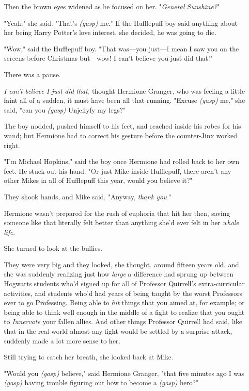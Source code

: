 Then the brown eyes widened as he focused on her. "\emph{General Sunshine?}"

"Yeah," she said. "That's \emph{(gasp)} me." If the Hufflepuff boy said
anything about her being Harry Potter's love interest, she decided, he was
going to die.

"Wow," said the Hufflepuff boy. "That was---you just---I mean I saw you on the
screens before Christmas but---wow! I can't believe you just did that!"

There was a pause.

\emph{I can't believe I just did that,} thought Hermione Granger, who was
feeling a little faint all of a sudden, it must have been all that running.
"Excuse \emph{(gasp)} me," she said, "can you \emph{(gasp)} Unjellyfy my legs?"

The boy nodded, pushed himself to his feet, and reached inside his robes for
his wand; but Hermione had to correct his gesture before the counter-Jinx
worked right.

"I'm Michael Hopkins," said the boy once Hermione had rolled back to her own
feet. He stuck out his hand. "Or just Mike inside Hufflepuff, there aren't any
other Mikes in all of Hufflepuff this year, would you believe it?"

They shook hands, and Mike said, "Anyway, \emph{thank you.}"

Hermione wasn't prepared for the rush of euphoria that hit her then, saving
someone like that literally felt better than anything she'd ever felt in her
\emph{whole life.}

She turned to look at the bullies.

They were very big and they looked, she thought, around fifteen years old, and
she was suddenly realizing just how \emph{large} a difference had sprung up
between Hogwarts students who'd signed up for all of Professor Quirrell's
extra-curricular activities, and students who'd had years of being taught by
the worst Professors ever to go Professing. Being able to \emph{hit} things
that you aimed at, for example; or being able to think well enough in the
middle of a fight to realize that you ought to \emph{Innervate} your fallen
allies. And other things Professor Quirrell had said, like that in the real
world almost any fight would be settled by a surprise attack, suddenly made a
lot more sense to her.

Still trying to catch her breath, she looked back at Mike.

"Would you \emph{(gasp)} believe," said Hermione Granger, "that five minutes
ago I was \emph{(gasp)} having trouble figuring out how to become a
\emph{(gasp)} hero?"

